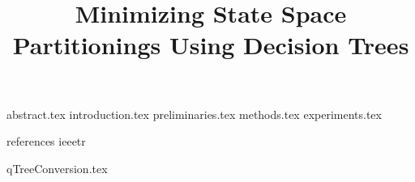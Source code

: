 \documentclass [
  letterpaper,
  10 pt,
  conference
] {ieeeconf}
\title {Minimizing State Space Partitionings Using Decision Trees}
\author {%
  \authorblockN {Andreas Holck Høeg-Petersen}
  \authorblockA {Aalborg University\\ Denmark}
  \and
  \authorblockN {Kim Guldstrand Larsen}
  \authorblockA {Aalborg University\\ Denmark}
  \and
  \authorblockN {Peter Gjøl Jensen}
  \authorblockA {Aalborg University\\ Denmark}
  \and
  \authorblockN {Andrzej Wąsowski}
  \authorblockA {IT University of Copenhagen\\ Denmark}
}
\begin{document}
\maketitle

 {abstract.tex}
 {introduction.tex}
 {preliminaries.tex}
 {methods.tex}
 {experiments.tex}

\newpage

 {references}
 {ieeetr}

\appendix

 {qTreeConversion.tex}
\end{document}
